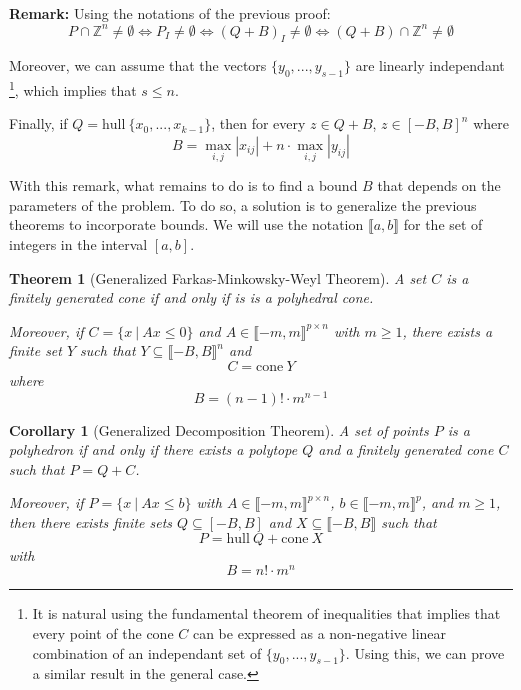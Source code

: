 \documentclass{article}
\newcommand{\cone}{\mathrm{cone}}
\newcommand{\hull}{\mathrm{hull}}
\newcommand{\ints}{\mathbb{Z}}
\newcommand{\ifff}{if and only if}
\newtheorem{theorem}{Theorem}
\newtheorem{corollary}{Corollary}
\begin{document}
\textbf{Remark:}
Using the notations of the previous proof:
\begin{displaymath}
  P \cap \ints^n \neq \emptyset \Longleftrightarrow
  P_I \neq \emptyset            \Longleftrightarrow
  (Q + B)_I \neq \emptyset      \Longleftrightarrow
  (Q + B) \cap \ints^n \neq \emptyset
\end{displaymath}


Moreover, we can assume that the vectors $\{y_0, ..., y_{s-1}\}$ are linearly
independant
\footnote{It is natural using the fundamental theorem of inequalities that
implies that every point of the cone $C$ can be expressed as a non-negative
linear combination of an independant set of $\{y_0, ..., y_{s-1}\}$. Using
this, we can prove a similar result in the general case.},
which implies that $s \leqslant n$.

Finally, if $Q = \hull~\{x_0, ..., x_{k-1}\}$, then
for every $z \in Q + B$, $z \in [-B, B]^n$
where
$$B = \max_{i, j} |x_{ij}| + n \cdot \max_{i, j} |y_{ij}|$$


With this remark, what remains to do is to find a bound $B$ that depends on the
parameters of the problem. To do so, a solution is to generalize the previous
theorems to incorporate bounds.
We will use the notation
$\llbracket a, b \rrbracket$ for the set of integers in the interval $[a, b]$.

\begin{theorem}[Generalized Farkas-Minkowsky-Weyl Theorem]
  A set $C$ is a finitely generated cone \ifff{} is is a polyhedral cone.

  Moreover, if $C = \{x~|~Ax \leqslant 0\}$ and
  $A \in \llbracket -m, m \rrbracket^{p \times n}$ with $m \geqslant 1$,
  there exists a finite set $Y$ such that
  $Y \subseteq \llbracket -B, B \rrbracket^n$
  and $$C = \cone~Y$$ where
  $$B = (n - 1)! \cdot m^{n-1}$$
\end{theorem}

\begin{corollary}[Generalized Decomposition Theorem]
  A set of points $P$ is a polyhedron \ifff{} there exists a polytope $Q$ and a
  finitely generated cone $C$ such that $P = Q + C$.

  Moreover, if $P = \{x~|~Ax \leqslant b\}$ with
  $A \in \llbracket -m, m \rrbracket^{p \times n}$,
  $b \in \llbracket -m, m \rrbracket^p$, and $m \geqslant 1$,
  then there exists finite sets
  $Q \subseteq [-B, B]$ and $X \subseteq \llbracket -B, B \rrbracket$ such that
  $$P = \hull~Q + \cone~X$$ with $$B = n! \cdot m^n$$
\end{corollary}
\end{document}
